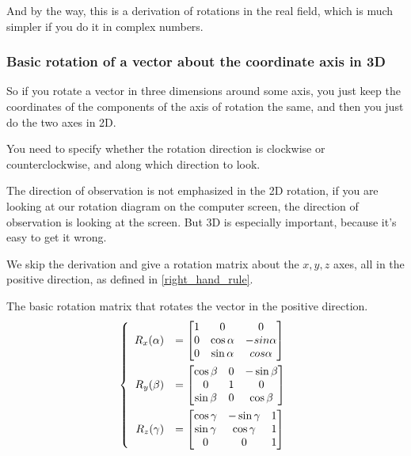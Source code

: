 \documentclass{article} %
\numberwithin{equation}{section} %
\begin{document}
And by the way, this is a derivation of rotations in the real field, which is much simpler if you do it in complex numbers.

\subsubsection{Basic rotation of a vector about the coordinate axis in 3D}

So if you rotate a vector in three dimensions around some axis, you just keep the coordinates of the components of the axis of rotation the same, and then you just do the two axes in 2D.

You need to specify whether the rotation direction is clockwise or counterclockwise, and along which direction to look.

The direction of observation is not emphasized in the 2D rotation, if you are looking at our rotation diagram on the computer screen, the direction of observation is looking at the screen.
But 3D is especially important, because it's easy to get it wrong.

We skip the derivation and give a rotation matrix about the $x,y,z$ axes, all in the positive direction, as defined in \ref{right_hand_rule}.

The basic rotation matrix that rotates the vector in the positive direction.
\begin{equation}\label{3d_rotation_matrix_rot_vec}
	\left\{
		\begin{array}{rl}
			R_x(\alpha)\vspace{1ex} &=\begin{bmatrix}
				1 & 0 & 0\\
				0 & \cos\alpha & -sin\alpha\\
				0 & \sin\alpha & cos\alpha
			\end{bmatrix}\\
			R_y(\beta)\vspace{1ex} &=\begin{bmatrix}
				\cos\beta & 0 & -\sin\beta\\
				0 & 1 & 0\\
				\sin\beta & 0 & \cos\beta
			\end{bmatrix}\\
			R_z(\gamma) &=\begin{bmatrix}
				\cos\gamma & -\sin\gamma & 1\\
				\sin\gamma & \cos\gamma & 1\\
				0 & 0 & 1
			\end{bmatrix}
		\end{array}
	\right.
\end{equation}
\end{document}
